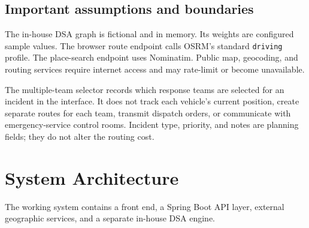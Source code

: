 \documentclass[11pt,a4paper]{article}
\begin{document}
\subsection{Important assumptions and boundaries}
The in-house DSA graph is fictional and in memory. Its weights are configured sample values. The browser route endpoint calls OSRM's standard \texttt{driving} profile. The place-search endpoint uses Nominatim. Public map, geocoding, and routing services require internet access and may rate-limit or become unavailable.

The multiple-team selector records which response teams are selected for an incident in the interface. It does not track each vehicle's current position, create separate routes for each team, transmit dispatch orders, or communicate with emergency-service control rooms. Incident type, priority, and notes are planning fields; they do not alter the routing cost.

\section{System Architecture}
The working system contains a front end, a Spring Boot API layer, external geographic services, and a separate in-house DSA engine.

\begin{center}
\end{center}
\end{document}
